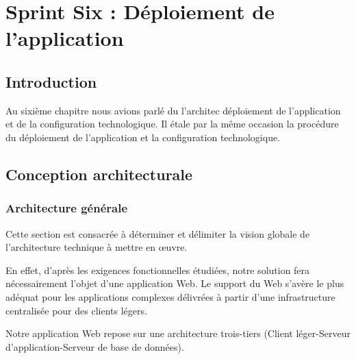 \graphicspath{{./chapitres/chapitre8/figures/}}
\setcounter{mtc}{8}
\chapter{Sprint Six : Déploiement de l'application}
\minitoc
\newpage
\section*{Introduction}
Au sixième chapitre nous avions parlé du l'architec déploiement de l'application et de la configuration technologique.
Il étale par la même occasion la procédure du déploiement de l'application et la configuration technologique.

\section{Conception architecturale}
\subsection{Architecture g\'en\'erale}
Cette section est consacr\'ee \`a d\'eterminer et d\'elimiter la vision globale de l'architecture technique \`a mettre en \oe uvre. 

En effet, d'apr\`es les exigences fonctionnelles \'etudi\'ees, notre solution fera n\'ecessairement l'objet d'une application Web. Le support du Web s'av\`ere le plus ad\'equat pour les applications complexes d\'elivr\'ees \`a partir d'une infrastructure centralis\'ee pour des clients l\'egers. 

Notre application Web repose sur une architecture trois-tiers (Client l\'eger-Serveur d'application-Serveur de base de donn\'ees).

